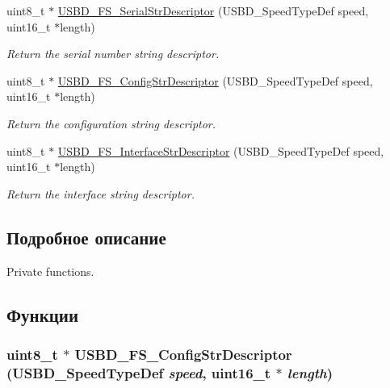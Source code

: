 \begin{CompactItemize}
uint8\_\-t $\ast$ \hyperlink{group___u_s_b_d___d_e_s_c___private___functions_gad2a1d1451821845eda602a82b1cd213}{USBD\_\-FS\_\-SerialStrDescriptor} (USBD\_\-SpeedTypeDef speed, uint16\_\-t $\ast$length)
\begin{CompactList}\small\item\em Return the serial number string descriptor. \item\end{CompactList}\item 
uint8\_\-t $\ast$ \hyperlink{group___u_s_b_d___d_e_s_c___private___functions_g40ed2a0fb60c50a285983a09ba6921d6}{USBD\_\-FS\_\-ConfigStrDescriptor} (USBD\_\-SpeedTypeDef speed, uint16\_\-t $\ast$length)
\begin{CompactList}\small\item\em Return the configuration string descriptor. \item\end{CompactList}\item 
uint8\_\-t $\ast$ \hyperlink{group___u_s_b_d___d_e_s_c___private___functions_gb248f43276f92d982ab5853111e4fb10}{USBD\_\-FS\_\-InterfaceStrDescriptor} (USBD\_\-SpeedTypeDef speed, uint16\_\-t $\ast$length)
\begin{CompactList}\small\item\em Return the interface string descriptor. \item\end{CompactList}\end{CompactItemize}


\subsection{Подробное описание}
Private functions. 

\subsection{Функции}
\hypertarget{group___u_s_b_d___d_e_s_c___private___functions_g40ed2a0fb60c50a285983a09ba6921d6}{
\subsubsection[{USBD\_\-FS\_\-ConfigStrDescriptor}]{\setlength{\rightskip}{0pt plus 5cm}uint8\_\-t $\ast$ USBD\_\-FS\_\-ConfigStrDescriptor (USBD\_\-SpeedTypeDef {\em speed}, \/  uint16\_\-t $\ast$ {\em length})}}
\label{group___u_s_b_d___d_e_s_c___private___functions_g40ed2a0fb60c50a285983a09ba6921d6}



